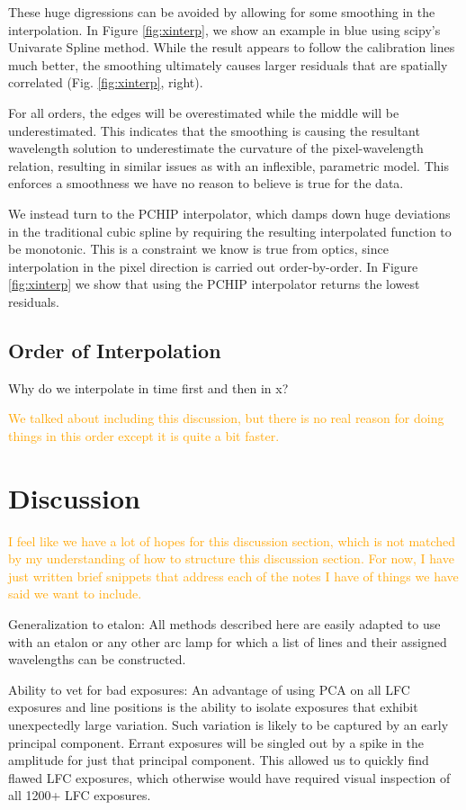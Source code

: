 \documentclass[12pt, letterpaper]{article}
\newcommand{\lz}[1]{\textcolor{orange}{#1}}
\begin{document}
These huge digressions can be avoided by allowing for some smoothing in the interpolation.  In Figure \ref{fig:xinterp}, we show an example in blue using scipy's Univarate Spline method.  While the result appears to follow the calibration lines much better, the smoothing ultimately causes larger residuals that are spatially correlated (Fig. \ref{fig:xinterp}, right).

For all orders, the edges will be overestimated while the middle will be underestimated.  This indicates that the smoothing is causing the resultant wavelength solution to underestimate the curvature of the pixel-wavelength relation, resulting in similar issues as with an inflexible, parametric model.  This enforces a smoothness we have no reason to believe is true for the data.

We instead turn to the PCHIP interpolator, which damps down huge deviations in the traditional cubic spline by requiring the resulting interpolated function to be monotonic.  This is a constraint we know is true from optics, since interpolation in the pixel direction is carried out order-by-order.  In Figure \ref{fig:xinterp} we show that using the PCHIP interpolator returns the lowest residuals.

\subsection{Order of Interpolation}
Why do we interpolate in time first and then in x?

\lz{We talked about including this discussion, but there is no real reason for doing things in this order except it is quite a bit faster.}


\section{Discussion} \label{sec:discussion}
\lz{I feel like we have a lot of hopes for this discussion section, which is not matched by my understanding of how to structure this discussion section.  For now, I have just written brief snippets that address each of the notes I have of things we have said we want to include.}

Generalization to etalon:
All methods described here are easily adapted to use with an etalon or any other arc lamp for which a list of lines and their assigned wavelengths can be constructed.

Ability to vet for bad exposures:
An advantage of using PCA on all LFC exposures and line positions is the ability to isolate exposures that exhibit unexpectedly large variation.  Such variation is likely to be captured by an early principal component.  Errant exposures will be singled out by a spike in the amplitude for just that principal component.  This allowed us to quickly find flawed LFC exposures, which otherwise would have required visual inspection of all 1200+ LFC exposures.
\end{document}
